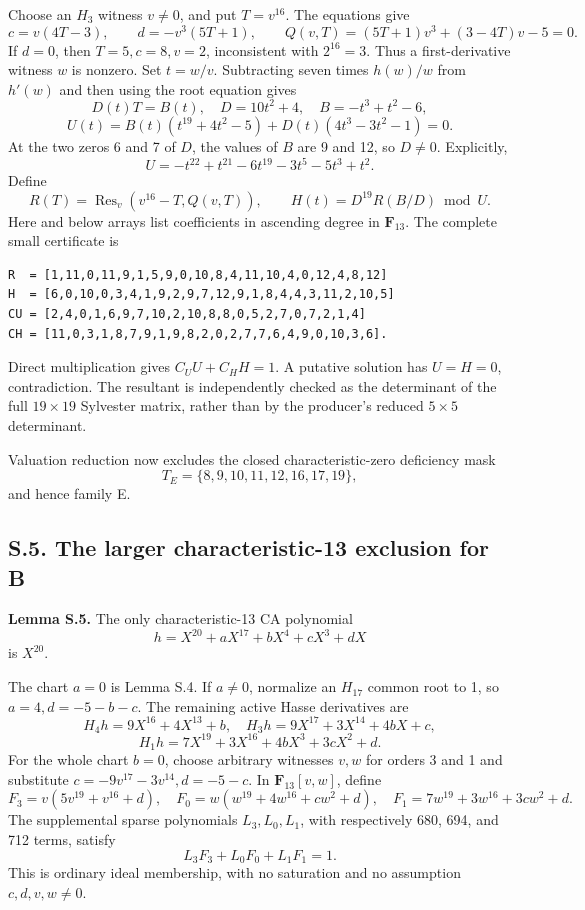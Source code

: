 \documentclass[
  british,
  10pt,
]{article}
\begin{document}
Choose an \(H_3\) witness \(v\ne0\), and put \(T=v^{16}\). The equations
give \[
c=v(4T-3),\qquad d=-v^3(5T+1),\qquad
Q(v,T)=(5T+1)v^3+(3-4T)v-5=0.
\] If \(d=0\), then \(T=5,c=8,v=2\), inconsistent with \(2^{16}=3\).
Thus a first-derivative witness \(w\) is nonzero. Set \(t=w/v\).
Subtracting seven times \(h(w)/w\) from \(h'(w)\) and then using the
root equation gives \[
D(t)T=B(t),\quad D=10t^2+4,\quad B=-t^3+t^2-6,
\] \[
U(t)=B(t)(t^{19}+4t^2-5)+D(t)(4t^3-3t^2-1)=0.
\] At the two zeros 6 and 7 of \(D\), the values of \(B\) are 9 and 12,
so \(D\ne0\). Explicitly, \[
U=-t^{22}+t^{21}-6t^{19}-3t^5-5t^3+t^2.
\] Define \[
R(T)=\operatorname{Res}_v(v^{16}-T,Q(v,T)),\qquad
H(t)=D^{19}R(B/D)\bmod U.
\] Here and below arrays list coefficients in ascending degree in
\(\mathbf F_{13}\). The complete small certificate is

\begin{verbatim}
R  = [1,11,0,11,9,1,5,9,0,10,8,4,11,10,4,0,12,4,8,12]
H  = [6,0,10,0,3,4,1,9,2,9,7,12,9,1,8,4,4,3,11,2,10,5]
CU = [2,4,0,1,6,9,7,10,2,10,8,8,0,5,2,7,0,7,2,1,4]
CH = [11,0,3,1,8,7,9,1,9,8,2,0,2,7,7,6,4,9,0,10,3,6].
\end{verbatim}

Direct multiplication gives \(C_UU+C_HH=1\). A putative solution has
\(U=H=0\), contradiction. The resultant is independently checked as the
determinant of the full \(19\times19\) Sylvester matrix, rather than by
the producer's reduced \(5\times5\) determinant.

Valuation reduction now excludes the closed characteristic-zero
deficiency mask \[
T_E=\{8,9,10,11,12,16,17,19\},
\] and hence family E.

\subsection{S.5. The larger characteristic-13 exclusion for
B}\label{s.5.-the-larger-characteristic-13-exclusion-for-b}

\textbf{Lemma S.5.} The only characteristic-13 CA polynomial \[
h=X^{20}+aX^{17}+bX^4+cX^3+dX
\tag{S8}
\] is \(X^{20}\).

The chart \(a=0\) is Lemma S.4. If \(a\ne0\), normalize an \(H_{17}\)
common root to 1, so \(a=4,d=-5-b-c\). The remaining active Hasse
derivatives are \[
H_4h=9X^{16}+4X^{13}+b,\quad
H_3h=9X^{17}+3X^{14}+4bX+c,
\] \[
H_1h=7X^{19}+3X^{16}+4bX^3+3cX^2+d.
\] For the whole chart \(b=0\), choose arbitrary witnesses \(v,w\) for
orders 3 and 1 and substitute \(c=-9v^{17}-3v^{14},d=-5-c\). In
\(\mathbf F_{13}[v,w]\), define \[
F_3=v(5v^{19}+v^{16}+d),\quad
F_0=w(w^{19}+4w^{16}+cw^2+d),\quad
F_1=7w^{19}+3w^{16}+3cw^2+d.
\] The supplemental sparse polynomials \(L_3,L_0,L_1\), with
respectively 680, 694, and 712 terms, satisfy \[
L_3F_3+L_0F_0+L_1F_1=1.
\tag{S9}
\] This is ordinary ideal membership, with no saturation and no
assumption \(c,d,v,w\ne0\).
\end{document}

